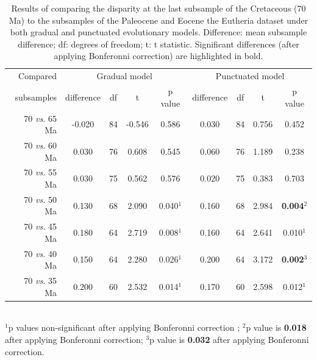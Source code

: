 \documentclass[12pt,letterpaper]{article}
\begin{document}
\begin{table}[ht]
\caption{Results of comparing the disparity at the last subsample of the Cretaceous (70 Ma) to the subsamples of the Paleocene and Eocene the Eutheria dataset under both gradual and punctuated evolutionary models. Difference: mean subsample difference; df: degrees of freedom; t: t statistic. Significant differences (after applying Bonferonni correction) are highlighted in bold.}
\label{tab:Tab_beck}
\centering
\begin{tabular}{r|cccc|cccc}
  \hline
  Compared & \multicolumn{4}{c|}{Gradual model} & \multicolumn{4}{c}{Punctuated model} \\
  subsamples & difference & df & t & p value & difference & df & t & p value \\ 
  \hline
  70 \textit{vs.} 65 Ma & -0.020 & 84 & -0.546 & 0.586 & 0.030 & 84 & 0.756 & 0.452 \\ 
  70 \textit{vs.} 60 Ma &  0.030 & 76 & 0.608 & 0.545 & 0.060 & 76 & 1.189 & 0.238 \\ 
  70 \textit{vs.} 55 Ma &  0.030 & 75 & 0.562 & 0.576 & 0.020 & 75 & 0.383 & 0.703 \\ 
  70 \textit{vs.} 50 Ma &  0.130 & 68 & 2.090 & 0.040$^1$ & 0.160 & 68 & 2.984 & \textbf{0.004}$^2$ \\ 
  70 \textit{vs.} 45 Ma &  0.180 & 64 & 2.719 & 0.008$^1$ & 0.160 & 64 & 2.641 & 0.010$^1$ \\ 
  70 \textit{vs.} 40 Ma &  0.150 & 64 & 2.280 & 0.026$^1$ & 0.200 & 64 & 3.172 & \textbf{0.002}$^3$ \\ 
  70 \textit{vs.} 35 Ma &  0.200 & 60 & 2.532 & 0.014$^1$ & 0.170 & 60 & 2.598 & 0.012$^1$ \\ 
   \hline
\end{tabular} \\
   $^1$p values non-significant after applying Bonferonni correction \citep{holm1979simple};
   $^2$p value is \textbf{0.018} after applying Bonferonni correction;
   $^3$p value is \textbf{0.032} after applying Bonferonni correction.
\end{table}
\end{document}

